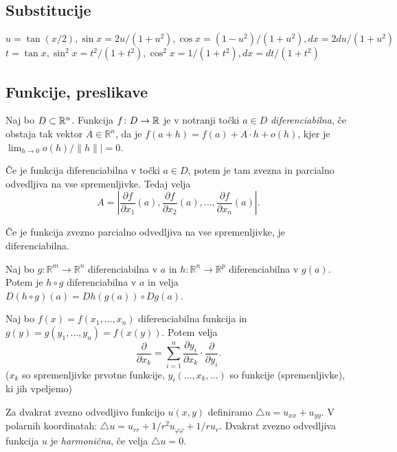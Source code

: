 \documentclass{formule}
\begin{document}
\subsection*{Substitucije}
\(u = \tan (x / 2), \sin x = 2u / (1 + u^2), \cos x = (1-u^2) / (1 + u^2), dx = 2 du / (1 + u^2)\) \\
\(t = \tan x, \sin^2 x = t^2 / (1 + t^2), \cos^2 x = 1 / (1 + t^2), dx = dt / (1 + t^2)\)

\subsection*{Funkcije, preslikave}
\begin{definition}
    Naj bo \(D \subset \mathbb{R}^n\). Funkcija \(f \colon D \to \mathbb{R}\) je v notranji točki \(a \in D\)
    \emph{diferenciabilna}, če obstaja tak vektor \(A \in \mathbb{R}^n\),
    da je \(f(a + h) = f(a) + A \cdot h + o(h)\), kjer je \(\lim_{h \to 0} o(h) / \| h \|| = 0\).
\end{definition}
\begin{theorem}
    Če je funkcija diferenciabilna v točki \(a \in D\), potem je tam zvezna in parcialno odvedljiva na vse spremenljivke. Tedaj velja
    \[A = \left | \frac{\partial f}{\partial x_1} (a), \frac{\partial f}{\partial x_2} (a), \ldots , \frac{\partial f}{\partial x_n} (a) \right |.\]
\end{theorem}
\begin{theorem}
    Če je funkcija zvezno parcialno odvedljiva na vse spremenljivke, je diferenciabilna.
\end{theorem}
\begin{theorem}
    Naj bo \(g \colon \mathbb{R}^m \to \mathbb{R}^n\) diferenciabilna v \(a\) in
    \(h \colon \mathbb{R}^n \to \mathbb{R}^p\) diferenciabilna v \(g (a)\). Potem je
    \(h \circ g\) diferenciabilna v \(a\) in velja \(D (h \circ g) (a) = D h (g (a)) \circ D g (a)\).
\end{theorem}
\begin{theorem}
    Naj bo \(f (x) = f(x_1, \ldots, x_n)\) diferenciabilna funkcija in \(g (y) = g(y_1, \ldots, y_n) = f (x (y))\).
    Potem velja
    \[\frac{\partial}{\partial x_k} = \sum_{i = 1}^{n} \frac{\partial y_i}{\partial x_k} \cdot \frac{\partial}{\partial y_i}.\]
    (\(x_k\) so spremenljivke prvotne funkcije, \(y_i (\ldots, x_k, \ldots)\) so funkcije (spremenljivke), ki jih vpeljemo)
\end{theorem}
\begin{definition}[Laplace]
    Za dvakrat zvezno odvedljivo funkcijo \(u (x, y)\) definiramo \(\triangle u = u_{xx} + u_{yy}\).
    V polarnih koordinatah: \(\triangle u = u_{rr} + 1 / r^2 u_{\varphi \varphi} + 1 / r u_{r}\).
    Dvakrat zvezno odvedljiva funkcija \(u\) je \emph{harmonična}, če velja \(\triangle u = 0\).
\end{definition}
\end{document}
